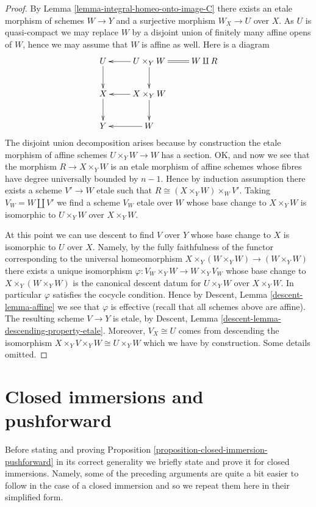 \begin{proof}
\medskip\noindent
By
Lemma \ref{lemma-integral-homeo-onto-image-C}
there exists an etale morphism of schemes $W \to Y$ and a
surjective morphism $W_X \to U$ over $X$.
As $U$ is quasi-compact we may replace $W$ by a disjoint union of
finitely many affine opens of $W$, hence we may assume that $W$
is affine as well. Here is a diagram
$$
\xymatrix{
U \ar[d] & U \times_Y W \ar[l] \ar[d] & W \amalg R \ar@{=}[l]\\
X \ar[d] & X \times_Y W \ar[l] \ar[d] \\
Y & W \ar[l]
}
$$
The disjoint union decomposition arises because by construction the
etale morphism of affine schemes $U \times_Y W \to W$ has a section.
OK, and now we see that the morphism $R \to X \times_Y W$ is an etale
morphism of affine schemes whose fibres have degree universally bounded
by $n - 1$. Hence by induction assumption there exists a scheme
$V' \to W$ etale such that $R \cong (X \times_Y W) \times_W V'$.
Taking $V_W = W \amalg V'$ we find a scheme $V_W$ etale over $W$ whose
base change to $X \times_Y W$ is isomorphic to $U \times_Y W$
over $X \times_Y W$.

\medskip\noindent
At this point we can use descent to find $V$ over $Y$ whose base
change to $X$ is isomorphic to $U$ over $X$. Namely, by the fully
faithfulness of the functor corresponding to the universal
homeomorphism $X \times_Y (W \times_Y W) \to (W \times_Y W)$
there exists a unique isomorphism $\varphi : V_W \times_Y W \to W \times_Y V_W$
whose base change to $X \times_Y (W \times_Y W)$ is the canonical
descent datum for $U \times_Y W$ over $X \times_Y W$. In particular
$\varphi$ satisfies the cocycle condition. Hence by
Descent, Lemma \ref{descent-lemma-affine}
we see that $\varphi$ is effective (recall that all schemes above are affine).
The resulting scheme $V \to Y$ is etale, by
Descent, Lemma \ref{descent-lemma-descending-property-etale}.
Moreover, $V_X \cong U$ comes from descending the isomorphism
$X \times_Y V \times_Y W \cong U \times_Y W$ which we have
by construction. Some details omitted.
\end{proof}







\section{Closed immersions and pushforward}
\label{section-closed-immersions}

\noindent
Before stating and proving
Proposition \ref{proposition-closed-immersion-pushforward}
in its correct generality we briefly state and prove it for
closed immersions. Namely, some of the preceding arguments
are quite a bit easier to follow in the case of a closed immersion and
so we repeat them here in their simplified form.

